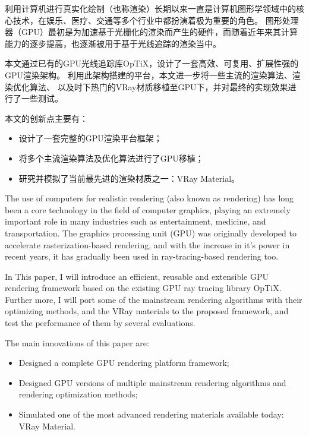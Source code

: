 \begin{cabstract}
  利用计算机进行真实化绘制（也称渲染）长期以来一直是计算机图形学领域中的核心技术，在娱乐、医疗、交通等多个行业中都扮演着极为重要的角色。
  图形处理器（GPU）最初是为加速基于光栅化的渲染而产生的硬件，而随着近年来其计算能力的逐步提高，也逐渐被用于基于光线追踪的渲染当中。

  本文通过已有的GPU光线追踪库OpTiX，设计了一套高效、可复用、扩展性强的GPU渲染架构。
  利用此架构搭建的平台，本文进一步将一些主流的渲染算法、渲染优化算法、
  以及时下热门的VRay材质移植至GPU下，并对最终的实现效果进行了一些测试。

  本文的创新点主要有：
  \begin{itemize}
    \item 设计了一套完整的GPU渲染平台框架；
    \item 将多个主流渲染算法及优化算法进行了GPU移植；
    \item 研究并模拟了当前最先进的渲染材质之一：VRay Material。
  \end{itemize}

\end{cabstract}


\begin{eabstract}

  The use of computers for realistic rendering (also known as rendering) has long been a core technology in the field of computer graphics, playing an extremely important role in many industries such as entertainment, medicine, and transportation.
  The graphics processing unit (GPU) was originally developed to accelerate rasterization-based rendering, and with the increase in it's power in recent years, it has gradually been used in ray-tracing-based rendering too.

  In This paper, I will introduce an efficient, reusable and extensible GPU rendering framework based on the existing GPU ray tracing library OpTiX.
  Further more, I will port some of the mainstream rendering algorithms with their optimizing methods,
  and the VRay materials to the proposed framework, and test the performance of them by several evaluations.

  The main innovations of this paper are:
  \begin{itemize}
    \item Designed a complete GPU rendering platform framework;
    \item Designed GPU versions of multiple mainstream rendering algorithms and rendering optimization methods;
    \item Simulated one of the most advanced rendering materials available today: VRay Material.
  \end{itemize} 
\end{eabstract}

